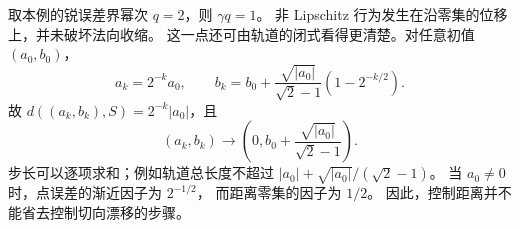 取本例的锐误差界幂次 $q=2$，则 $\gamma q=1$。
非 Lipschitz 行为发生在沿零集的位移上，并未破坏法向收缩。
这一点还可由轨道的闭式看得更清楚。对任意初值 $(a_0,b_0)$，
\[
 a_k=2^{-k}a_0,\qquad
 b_k=b_0+\frac{\sqrt{|a_0|}}{\sqrt2-1}(1-2^{-k/2}).
\]
故 $d((a_k,b_k),S)=2^{-k}|a_0|$，且
\[
 (a_k,b_k)\longrightarrow
 \left(0,b_0+\frac{\sqrt{|a_0|}}{\sqrt2-1}\right).
\]
步长可以逐项求和；例如轨道总长度不超过
$|a_0|+\sqrt{|a_0|}/(\sqrt2-1)$。
当 $a_0\ne0$ 时，点误差的渐近因子为 $2^{-1/2}$，
而距离零集的因子为 $1/2$。
因此，控制距离并不能省去控制切向漂移的步骤。
